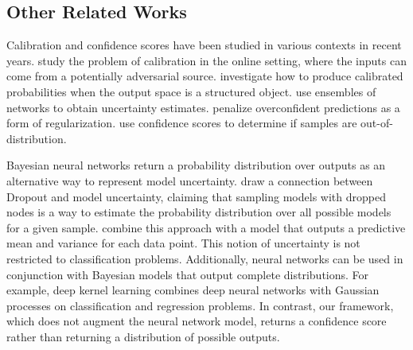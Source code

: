 \subsection{Other Related Works}
Calibration and confidence scores have been studied in various contexts in recent years. \citet{kuleshovE16} study the problem of calibration in the online setting, where the inputs can come from a potentially adversarial source. \citet{kuleshov2015calibrated} investigate how to produce calibrated probabilities when the output space is a structured object.
\citet{lakshminarayanan2016simple} use ensembles of networks to obtain uncertainty estimates.
 \citet{pereyra2017regularizing} penalize overconfident predictions as a form of regularization.
\citet{hendrycks2016baseline} use confidence scores to determine if samples are out-of-distribution.

Bayesian neural networks \cite{denker1990transforming,mackay1992practical} return a probability distribution over outputs as an alternative way to represent model uncertainty.
\citet{gal2015dropout} draw a connection between Dropout \cite{srivastava2014dropout} and model uncertainty, claiming that sampling models with dropped nodes is a way to estimate the probability distribution over all possible models for a given sample.
\citet{kendall2017uncertainties} combine this approach with a model that outputs a predictive mean and variance for each data point.
This notion of uncertainty is not restricted to classification problems.
Additionally, neural networks can be used in conjunction with Bayesian models that output complete distributions.
For example, deep kernel learning \cite{wilson2016stochastic,wilson2016deep,al2016learning} combines deep neural networks with Gaussian processes on classification and regression problems.
In contrast, our framework, which does not augment the neural network model, returns a confidence score rather than returning a distribution of possible outputs.
